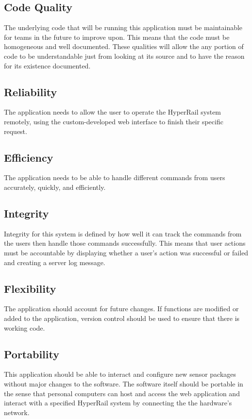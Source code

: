 \documentclass[onecolumn, draftclsnofoot,10pt, compsoc]{IEEEtran}
\begin{document}
\subsection{Code Quality}
The underlying code that will be running this application must be maintainable for teams in the future to improve upon. This means that the code must be homogeneous and well documented. These qualities will allow the any portion of code to be understandable just from looking at its source and to have the reason for its existence documented.

\subsection{Reliability} 
The application needs to allow the user to operate the HyperRail system remotely, using the custom-developed web interface to finish their specific request.

\subsection{Efficiency}
The application needs to be able to handle different commands from users accurately, quickly, and efficiently.

\subsection{Integrity}
Integrity for this system is defined by how well it can track the commands from the users then handle those commands successfully. This means that user actions must be accountable by displaying whether a user's action was successful or failed and creating a server log message.

\subsection{Flexibility}
The application should account for future changes. If functions are modified or added to the application, version control should be used to ensure that there is working code.

\subsection{Portability}
This application should be able to interact and configure new sensor packages without major changes to the software. The software itself should be portable in the sense that personal computers can host and access the web application and interact with a specified HyperRail system by connecting the the hardware's network.
\end{document}
